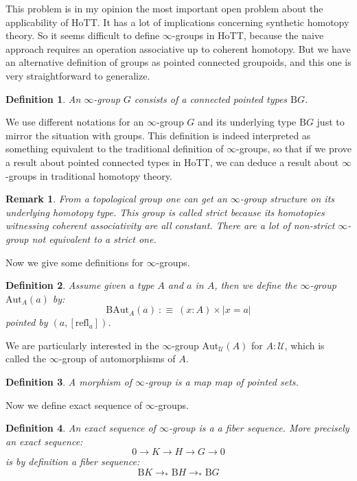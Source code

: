 \documentclass{article}
\newcommand{\U}{{\mathcal U}}
\renewcommand{\r}{\rightarrow}
\newcommand{\refl}{\mathrm{refl}}
\newcommand{\B}{\mathrm{B}}
\newcommand{\Aut}{\mathrm{Aut}}
\newtheorem{definition}{Definition}
\newtheorem{remark}{Remark}
\begin{document}
This problem is in my opinion the most important open problem about the applicability of HoTT. It has a lot of implications concerning synthetic homotopy theory. So it seems difficult to define $\infty$-groups in HoTT, because the naive approach requires an operation associative up to coherent homotopy. But we have an alternative definition of groups as pointed connected groupoids, and this one is very straightforward to generalize.

\begin{definition}
An $\infty$-group $G$ consists of a connected pointed types $\B G$.
\end{definition}

We use different notations for an $\infty$-group $G$ and its underlying type $\B G$ just to mirror the situation with groups. This definition is indeed interpreted as something equivalent to the traditional definition of $\infty$-groups, so that if we prove a result about pointed connected types in HoTT, we can deduce a result about $\infty$-groups in traditional homotopy theory. 

\begin{remark}
From a topological group one can get an $\infty$-group structure on its underlying homotopy type. This group is called strict because its homotopies witnessing coherent associativity are all constant. There are a lot of non-strict $\infty$-group not equivalent to a strict one.%
\end{remark}

Now we give some definitions for $\infty$-groups.

\begin{definition}
Assume given a type $A$ and $a$ in $A$, then we define the $\infty$-group $\Aut_A(a)$ by:
\[\B \Aut_A(a) \ :\equiv\ (x:A)\times |x=a|\]
pointed by $(a,[\refl_a])$.
\end{definition}

We are particularly interested in the $\infty$-group $\Aut_\U(A)$ for $A:\U$, which is called the $\infty$-group of automorphisms of $A$.

\begin{definition}
A morphism of $\infty$-group is a map map of pointed sets. 
\end{definition}

Now we define exact sequence of $\infty$-groups.

\begin{definition}
An exact sequence of $\infty$-group is a a fiber sequence. More precisely an exact sequence:
\[0\r K\r H\r G\r 0\]
is by definition a fiber sequence:
\[\B K\r_*\B H\r_*\B G\]
\end{definition}
\end{document}
